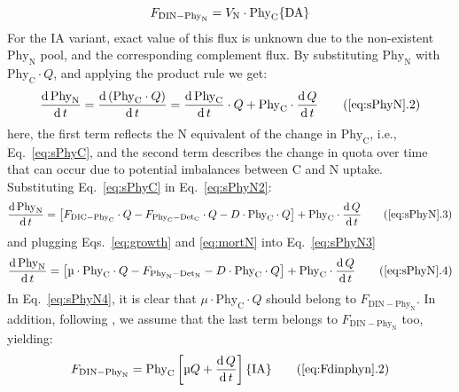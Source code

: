 \documentclass[gmd, manuscript]{copernicus}
\begin{document}
\begin{equation}
  \label{eq:Fdinphyn}
  F_{\text{DIN}-\text{Phy}_{\text{N}}} = V_{\text{N}} \cdot \text{Phy}_{\text{C}} \hfill \{\text{DA}\}
\end{equation}
For the IA variant, exact value of this flux is unknown due to the non-existent $\text{Phy}_{\text{N}}$ pool, and the corresponding complement flux. By substituting $\text{Phy}_{\text{N}}$ with  $\text{Phy}_{\text{C}}\cdot Q$, and applying the product rule we get:
\begin{equation}
  \label{eq:sPhyN2}
  \frac{\mathrm{d}\,\text{Phy}_{\text{N}}}{\mathrm{d}\,t} = \frac{\mathrm{d}\,(\text{Phy}_{\text{C}}\cdot Q)}{\mathrm{d}\,t}
  = \frac{\mathrm{d}\,\text{Phy}_{\text{C}}}{\mathrm{d}\,t} \cdot Q + \text{Phy}_{\text{C}} \cdot \frac{\mathrm{d}\,Q}{\mathrm{d}\,t} \tag{\ref{eq:sPhyN}.2}
\end{equation}
here, the first term reflects the N equivalent of the change in $\text{Phy}_{\text{C}}$, i.e., Eq.~\ref{eq:sPhyC}, and the second term describes the change in quota over time that can occur due to potential imbalances between C and N uptake. Substituting Eq.~\ref{eq:sPhyC} in Eq.~\ref{eq:sPhyN2}:
\begin{equation}
  \label{eq:sPhyN3}
  \frac{\mathrm{d}\,\text{Phy}_{\text{N}}}{\mathrm{d}\,t} = \left[ F_{\text{DIC}-\text{Phy}_{\text{C}}} \cdot Q - F_{\text{Phy}_{\text{C}}-\text{Det}_{\text{C}}} \cdot Q - D \cdot \text{Phy}_{\text{C}} \cdot Q \right] + \text{Phy}_{\text{C}} \cdot \frac{\mathrm{d}\,Q}{\mathrm{d}\,t}
 \tag{\ref{eq:sPhyN}.3}
\end{equation}
and plugging Eqs.~\ref{eq:growth} and \ref{eq:mortN} into Eq.~\ref{eq:sPhyN3}
\begin{equation}
  \label{eq:sPhyN4}
  \frac{\mathrm{d}\,\text{Phy}_{\text{N}}}{\mathrm{d}\,t} = \left[ \mu \cdot \text{Phy}_{\text{C}} \cdot Q - F_{\text{Phy}_{\text{N}}-\text{Det}_{\text{N}}} - D \cdot \text{Phy}_{\text{C}} \cdot Q \right] + \text{Phy}_{\text{C}} \cdot \frac{\mathrm{d}\,Q}{\mathrm{d}\,t}
 \tag{\ref{eq:sPhyN}.4}
\end{equation}
In Eq.~\ref{eq:sPhyN4}, it is clear that $\mu \cdot \text{Phy}_{\text{C}} \cdot Q$ should belong to $F_{\text{DIN}-\text{Phy}_{\text{N}}}$. In addition, following \citet{Smith2016}, we assume that the last term belongs to $F_{\text{DIN}-\text{Phy}_{\text{N}}}$ too, yielding:
\begin{equation}
  \label{eq:Fdinphyn2}
  F_{\text{DIN}-\text{Phy}_{\text{N}}} = \text{Phy}_{\text{C}} \left[ \mu Q + \frac{\mathrm{d}\,Q}{\mathrm{d}\,t} \right] \hfill \{\text{IA}\}
  \tag{\ref{eq:Fdinphyn}.2}
\end{equation}
\end{document}
